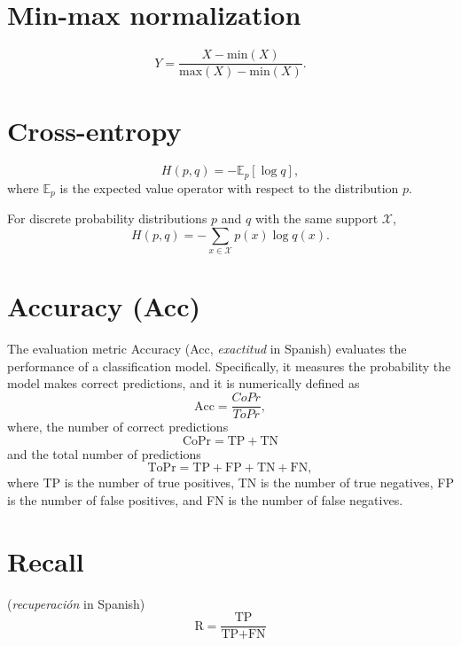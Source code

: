 \section{Min-max normalization}
\begin{equation}
  Y = \frac{X-\text{min}(X)}{\text{max}(X)-\text{min}(X)}.
\end{equation}

\section{Cross-entropy}
\begin{equation}
  H(p,q) = -\mathbb{E}_p[\log q],
\end{equation}
where $\mathbb{E}_p$ is the expected value operator with respect to
the distribution $p$.

For discrete probability distributions $p$ and $q$ with the same support $\mathcal{X}$,
\begin{equation}
  H(p,q) = -\sum_{x\in\mathcal{X}}p(x)\log q(x).
\end{equation}

\section{Accuracy (Acc)}
The evaluation metric Accuracy (Acc, \emph{exactitud} in Spanish) evaluates the performance of a
classification model. Specifically, it measures the probability the model
makes correct predictions, and it is numerically defined as
\begin{equation}
  \text{Acc} = \frac{CoPr}{ToPr},
\end{equation}
where, the number of correct predictions
\begin{equation}
  \text{CoPr} = \text{TP} + \text{TN}
\end{equation}
and the total number of predictions
\begin{equation}
  \text{ToPr} = \text{TP} + \text{FP} + \text{TN} + \text{FN},
\end{equation}
where TP is the number of true positives, TN is the number of true
negatives, FP is the number of false positives, and FN is the number
of false negatives.

\section{Recall}
(\emph{recuperación} in Spanish)
\begin{equation}
  \text{R} = \frac{\text{TP}}{\text{TP} + \text{FN}}
\end{equation}

